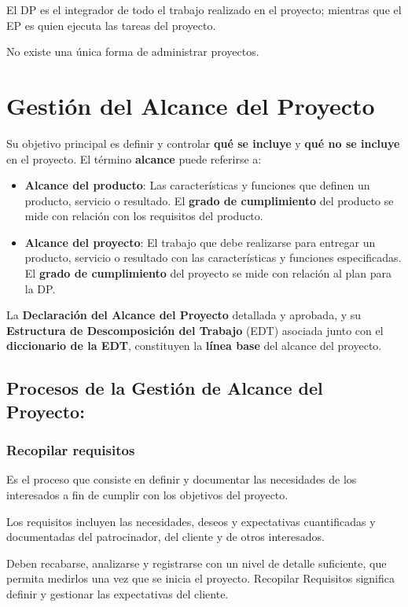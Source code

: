 \documentclass[10pt,a4paper]{article}
\begin{document}
El DP es el integrador de todo el trabajo realizado en el proyecto; mientras que el EP es quien ejecuta las tareas del proyecto. 

No existe una única forma de administrar proyectos.

\section{Gestión del Alcance del Proyecto}
Su objetivo principal es definir y controlar \textbf{qué se incluye} y \textbf{qué no se incluye} en el proyecto. El término \textbf{alcance} puede referirse a:
\begin{itemize}
\item \textbf{Alcance del producto}: Las características y funciones que definen un producto, servicio o resultado. El \textbf{grado de cumplimiento} del producto se mide con relación con los requisitos del producto.
\item \textbf{Alcance del proyecto}: El trabajo que debe realizarse para entregar un producto, servicio o resultado con las características y funciones especificadas. El \textbf{grado de cumplimiento} del proyecto se mide con relación al plan para la DP.
\end{itemize}
La \textbf{Declaración del Alcance del Proyecto} detallada y aprobada, y su \textbf{Estructura de Descomposición del Trabajo} (EDT) asociada junto con el \textbf{diccionario de la EDT}, constituyen la \textbf{línea base} del alcance del proyecto.

\subsection{Procesos de la Gestión de Alcance del Proyecto:}

\subsubsection{Recopilar requisitos}
Es el proceso que consiste en definir y documentar las necesidades de los interesados a fin de cumplir con los objetivos del proyecto.

Los requisitos incluyen las necesidades, deseos y expectativas cuantificadas y documentadas del patrocinador, del cliente y de otros interesados.

Deben recabarse, analizarse y registrarse con un nivel de detalle suficiente, que permita medirlos una vez que se inicia el proyecto. Recopilar Requisitos significa definir y gestionar las expectativas del cliente.
\end{document}
